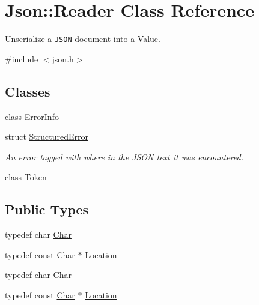 \hypertarget{class_json_1_1_reader}{}\section{Json\+:\+:Reader Class Reference}
\label{class_json_1_1_reader}


Unserialize a \href{http://www.json.org}{\tt J\+S\+ON} document into a \hyperlink{class_json_1_1_value}{Value}.  




{\ttfamily \#include $<$json.\+h$>$}

\subsection*{Classes}
\begin{DoxyCompactItemize}
\item 
class \hyperlink{class_json_1_1_reader_1_1_error_info}{Error\+Info}
\item 
struct \hyperlink{struct_json_1_1_reader_1_1_structured_error}{Structured\+Error}
\begin{DoxyCompactList}\small\item\em An error tagged with where in the J\+S\+ON text it was encountered. \end{DoxyCompactList}\item 
class \hyperlink{class_json_1_1_reader_1_1_token}{Token}
\end{DoxyCompactItemize}
\subsection*{Public Types}
\begin{DoxyCompactItemize}
\item 
typedef char \hyperlink{class_json_1_1_reader_a3eec9118f3e9a672ba8348c3a79d0f45}{Char}
\item 
typedef const \hyperlink{class_json_1_1_reader_a3eec9118f3e9a672ba8348c3a79d0f45}{Char} $\ast$ \hyperlink{class_json_1_1_reader_a46795b5b272bf79a7730e406cb96375a}{Location}
\item 
typedef char \hyperlink{class_json_1_1_reader_a3eec9118f3e9a672ba8348c3a79d0f45}{Char}
\item 
typedef const \hyperlink{class_json_1_1_reader_a3eec9118f3e9a672ba8348c3a79d0f45}{Char} $\ast$ \hyperlink{class_json_1_1_reader_a46795b5b272bf79a7730e406cb96375a}{Location}
\end{DoxyCompactItemize}
